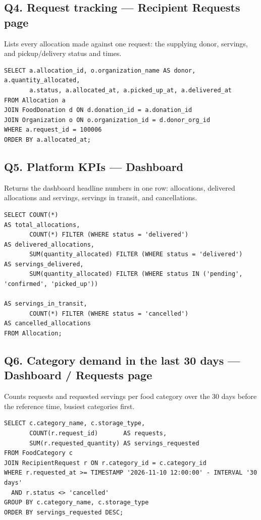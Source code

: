 \documentclass[11pt,letterpaper]{article}
\begin{document}
\subsection*{Q4. Request tracking --- Recipient Requests page}
Lists every allocation made against one request: the supplying donor, servings, and pickup/delivery status and times.

\begin{lstlisting}
SELECT a.allocation_id, o.organization_name AS donor, a.quantity_allocated,
       a.status, a.allocated_at, a.picked_up_at, a.delivered_at
FROM Allocation a
JOIN FoodDonation d ON d.donation_id = a.donation_id
JOIN Organization o ON o.organization_id = d.donor_org_id
WHERE a.request_id = 100006
ORDER BY a.allocated_at;
\end{lstlisting}

\subsection*{Q5. Platform KPIs --- Dashboard}
Returns the dashboard headline numbers in one row: allocations, delivered allocations and servings, servings in transit, and cancellations.

\begin{lstlisting}
SELECT COUNT(*)                                                       AS total_allocations,
       COUNT(*) FILTER (WHERE status = 'delivered')                   AS delivered_allocations,
       SUM(quantity_allocated) FILTER (WHERE status = 'delivered')    AS servings_delivered,
       SUM(quantity_allocated) FILTER (WHERE status IN ('pending', 'confirmed', 'picked_up'))
                                                                      AS servings_in_transit,
       COUNT(*) FILTER (WHERE status = 'cancelled')                   AS cancelled_allocations
FROM Allocation;
\end{lstlisting}

\subsection*{Q6. Category demand in the last 30 days --- Dashboard / Requests page}
Counts requests and requested servings per food category over the 30 days before the reference time, busiest categories first.

\begin{lstlisting}
SELECT c.category_name, c.storage_type,
       COUNT(r.request_id)       AS requests,
       SUM(r.requested_quantity) AS servings_requested
FROM FoodCategory c
JOIN RecipientRequest r ON r.category_id = c.category_id
WHERE r.requested_at >= TIMESTAMP '2026-11-10 12:00:00' - INTERVAL '30 days'
  AND r.status <> 'cancelled'
GROUP BY c.category_name, c.storage_type
ORDER BY servings_requested DESC;
\end{lstlisting}
\end{document}
